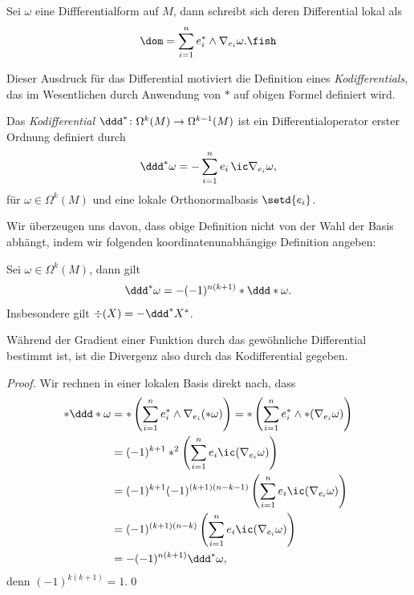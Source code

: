 \documentclass[%
	paper=a5,%
	fleqn,%
	DIV=18,%
	BCOR=0mm,
	fontsize=11pt,
	titlepage=false,%
	bibliography=totoc,
	DIV=18,%
	twoside=true,
	pdftitle=Riemannsche Geometrie,
	pdfauthor=Uwe Semmelmann,
	numbers=noendperiod]%
	{scrbook}
\begin{document}
\begin{lem}
Sei $\omega$ eine Diffferentialform auf $M$, dann schreibt sich deren Differential lokal als
\begin{align*}
\dom = \sum_{i=1}^n e_{i}^* \wedge \nabla_{e_{i}}\omega.\fish
\end{align*}
\end{lem}

Dieser Ausdruck für das Differential motiviert die Definition eines \textit{Kodifferentials}, das im Wesentlichen durch Anwendung von $*$ auf obigen Formel definiert wird.

\begin{defn}
Das \emph{Kodifferential} $\ddd^*\colon \Omega^k(M)\to \Omega^{k-1}(M)$ ist ein Differentialoperator erster Ordnung definiert durch
\begin{align*}
\ddd^*\omega = - \sum_{i=1}^n e_{i}\,\ic \nabla_{e_{i}}\omega,
\end{align*}
für $\omega\in\Omega^k(M)$ und eine lokale Orthonormalbasis $\setd{e_{i}}$.\fish
\end{defn}

Wir überzeugen uns davon, dass obige Definition nicht von der Wahl der Basis abhängt, indem wir folgenden koordinatenunabhängige Definition angeben:

\begin{lem}
\label{lem:Kodifferential-Hodge}
Sei $\omega\in\Omega^k(M)$, dann gilt
\begin{align*}
\ddd^*\omega = -(-1)^{n(k+1)}*\ddd*\omega.
\end{align*}
Insbesondere gilt $\div(X) = -\ddd^*X^*$.\fish
\end{lem}

Während der Gradient einer Funktion durch das gewöhnliche Differential bestimmt ist, ist die Divergenz also durch das Kodifferential gegeben.

\begin{proof}
Wir rechnen in einer lokalen Basis direkt nach, dass
\begin{align*}
*\ddd*\omega &= *\left(
\sum_{i=1}^n e_{i}^* \wedge \nabla_{e_{i}}(*\omega)\right)
= *\left(\sum_{i=1}^n e_{i}^*\wedge *(\nabla_{e_{i}}\omega)\right)\\
&= (-1)^{k+1}*^2
\left(\sum_{i=1}^n e_{i}\ic (\nabla_{e_{i}}\omega)\right)\\
&= (-1)^{k+1}(-1)^{(k+1)(n-k-1)}
\left(\sum_{i=1}^n e_{i}\ic (\nabla_{e_{i}}\omega)\right)\\
&= (-1)^{(k+1)(n-k)}
\left(\sum_{i=1}^n e_{i}\ic (\nabla_{e_{i}}\omega)\right)\\
&=
-(-1)^{n(k+1)}\ddd^* \omega,
\end{align*}
denn $(-1)^{k(k+1)} = 1$.\qed
\end{proof}
\end{document}
